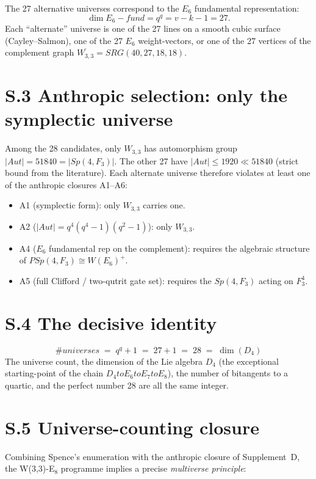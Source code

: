 \documentclass[12pt,a4paper]{article}
\def\mathbb#1{#1}%
\def\mathrm#1{#1}%
\def\textbf#1{#1}%
\def\text#1{#1}%
\def\to{ to }%
\theoremstyle{definition}
\newcommand{\SRG}{\mathrm{SRG}}
\newcommand{\Sp}{\mathrm{Sp}}
\newcommand{\PSp}{\mathrm{PSp}}
\newcommand{\Aut}{\mathrm{Aut}}
\newcommand{\FF}{\mathbb{F}}
\begin{document}
The 27 alternative universes correspond to the $E_6$ fundamental
representation:
\[
\dim E_6\text{-fund} = q^q = v - k - 1 = 27.
\]
Each ``alternate'' universe is one of the 27 lines on a smooth cubic
surface (Cayley--Salmon), one of the 27 $E_6$ weight-vectors, or one
of the 27 vertices of the complement graph $\overline{W_{3,3}} =
\SRG(40,27,18,18)$.

\section*{S.3 \quad Anthropic selection: only the symplectic universe}

Among the 28 candidates, only $W_{3,3}$ has automorphism group
$|\Aut| = 51840 = |\Sp(4,\FF_3)|$. The other 27 have
$|\Aut| \le 1920 \ll 51840$ (strict bound from the literature). Each
alternate universe therefore violates at least one of the anthropic
closures A1--A6:

\begin{itemize}[leftmargin=2em]
\item \textbf{A1 (symplectic form)}: only $W_{3,3}$ carries one.
\item \textbf{A2 (\boldmath$|\Aut| = q^4(q^4{-}1)(q^2{-}1)$)}: only $W_{3,3}$.
\item \textbf{A4 ($E_6$ fundamental rep on the complement)}: requires the
algebraic structure of $\PSp(4,\FF_3) \cong W(E_6)^+$.
\item \textbf{A5 (full Clifford / two-qutrit gate set)}: requires the
$\Sp(4,\FF_3)$ acting on $\FF_3^4$.
\end{itemize}

\section*{S.4 \quad The decisive identity}

\[
\boxed{\;\#\text{universes} \;=\; q^q + 1 \;=\; 27 + 1 \;=\; 28 \;=\; \dim(D_4)\;}
\]
The universe count, the dimension of the Lie algebra $D_4$ (the
exceptional starting-point of the chain $D_4 \to E_6 \to E_7 \to E_8$),
the number of bitangents to a quartic, and the perfect number 28 are
all the same integer.

\section*{S.5 \quad Universe-counting closure}

Combining Spence's enumeration with the anthropic closure of
Supplement~D, the W(3,3)-E$_8$ programme implies a precise
\emph{multiverse principle}:
\end{document}

